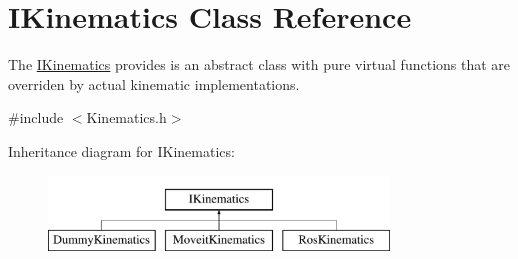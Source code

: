 \hypertarget{classIKinematics}{\section{I\-Kinematics Class Reference}
\label{classIKinematics}
}


The \hyperlink{classIKinematics}{I\-Kinematics} provides is an abstract class with pure virtual functions that are overriden by actual kinematic implementations.  




{\ttfamily \#include $<$Kinematics.\-h$>$}

Inheritance diagram for I\-Kinematics\-:\begin{figure}[H]
\begin{center}
\leavevmode
\includegraphics[height=1.996435cm]{classIKinematics}
\end{center}
\end{figure}
